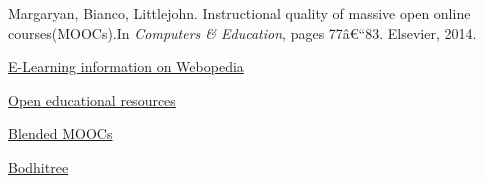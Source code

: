 \documentclass[13pt]{beamer}
\begin{document}
\begin{frame}[shrink=50]
\begin{thebibliography}{1}
  Margaryan, Bianco, Littlejohn. Instructional quality of massive open online courses(MOOCs).In \textit{Computers \& Education}, pages 77â€“83. Elsevier, 2014.

 \href{http://www.webopedia.com/TERM/E/e_learning.html}{E-Learning information on Webopedia}

 \href{http://en.wikipedia.org/wiki/Open_educational_resources}{Open educational resources}

 \href{http://campustechnology.com/articles/2013/08/21/blended-moocs-the-best-of-both-worlds.aspx}{Blended MOOCs}

 \href{http://bodhitree.cse.iitb.ac.in/mission/}{ Bodhitree}

\end{thebibliography}

\end{frame}
\end{document}
